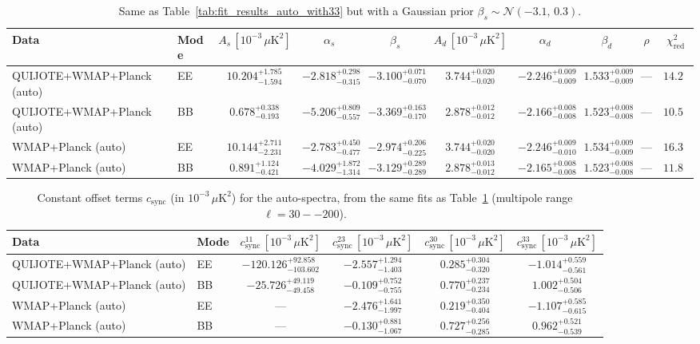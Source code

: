 \begin{table}[h]
\centering
\scriptsize
\setlength{\tabcolsep}{4pt}
\caption{Same as Table~\ref{tab:fit_results_auto_with33} but with a Gaussian prior $\beta_s \sim \mathcal{N}(-3.1,\,0.3)$.}
\label{tab:fit_results_auto_with33_prior_betas}
\begin{tabular}{llcccccccc}
\toprule
Data & Mode & $A_s\,[10^{-3}\,\mu\mathrm{K}^2]$ & $\alpha_s$ & $\beta_s$ & $A_d\,[10^{-3}\,\mu\mathrm{K}^2]$ & $\alpha_d$ & $\beta_d$ & $\rho$ & $\chi^2_\mathrm{red}$ \\
\midrule
QUIJOTE+WMAP+Planck (auto) & EE & $10.204^{+1.785}_{-1.594}$ & $-2.818^{+0.298}_{-0.315}$ & $-3.100^{+0.071}_{-0.070}$ & $3.744^{+0.020}_{-0.020}$ & $-2.246^{+0.009}_{-0.009}$ & $1.533^{+0.009}_{-0.009}$ & --- & $14.29$ \\
QUIJOTE+WMAP+Planck (auto) & BB & $0.678^{+0.338}_{-0.193}$ & $-5.206^{+0.809}_{-0.557}$ & $-3.369^{+0.163}_{-0.170}$ & $2.878^{+0.012}_{-0.012}$ & $-2.166^{+0.008}_{-0.008}$ & $1.523^{+0.008}_{-0.008}$ & --- & $10.53$ \\
WMAP+Planck (auto) & EE & $10.144^{+2.711}_{-2.231}$ & $-2.783^{+0.450}_{-0.477}$ & $-2.974^{+0.206}_{-0.225}$ & $3.744^{+0.020}_{-0.020}$ & $-2.246^{+0.009}_{-0.010}$ & $1.534^{+0.009}_{-0.009}$ & --- & $16.39$ \\
WMAP+Planck (auto) & BB & $0.891^{+1.124}_{-0.421}$ & $-4.029^{+1.872}_{-1.314}$ & $-3.129^{+0.289}_{-0.289}$ & $2.878^{+0.013}_{-0.012}$ & $-2.165^{+0.008}_{-0.008}$ & $1.523^{+0.008}_{-0.008}$ & --- & $11.88$ \\
\bottomrule
\end{tabular}
\end{table}

\begin{table}[h]
\centering
\scriptsize
\setlength{\tabcolsep}{4pt}
\caption{Constant offset terms $c_{\mathrm{sync}}$ (in $10^{-3}\,\mu\mathrm{K}^2$) for the auto-spectra, from the same fits as Table~\ref{tab:fit_results_auto_with33_prior_betas} (multipole range $\ell=30--200$).}
\label{tab:fit_results_auto_with33_prior_betas_c_terms}
\begin{tabular}{llcccc}
\toprule
Data & Mode & $c_{\mathrm{sync}}^{11}\,[10^{-3}\,\mu\mathrm{K}^2]$ & $c_{\mathrm{sync}}^{23}\,[10^{-3}\,\mu\mathrm{K}^2]$ & $c_{\mathrm{sync}}^{30}\,[10^{-3}\,\mu\mathrm{K}^2]$ & $c_{\mathrm{sync}}^{33}\,[10^{-3}\,\mu\mathrm{K}^2]$ \\
\midrule
QUIJOTE+WMAP+Planck (auto) & EE & $-120.126^{+92.858}_{-103.602}$ & $-2.557^{+1.294}_{-1.403}$ & $0.285^{+0.304}_{-0.320}$ & $-1.014^{+0.559}_{-0.561}$ \\
QUIJOTE+WMAP+Planck (auto) & BB & $-25.726^{+49.119}_{-49.458}$ & $-0.109^{+0.752}_{-0.755}$ & $0.770^{+0.237}_{-0.234}$ & $1.002^{+0.504}_{-0.506}$ \\
WMAP+Planck (auto) & EE & --- & $-2.476^{+1.641}_{-1.997}$ & $0.219^{+0.350}_{-0.404}$ & $-1.107^{+0.585}_{-0.615}$ \\
WMAP+Planck (auto) & BB & --- & $-0.130^{+0.881}_{-1.067}$ & $0.727^{+0.256}_{-0.285}$ & $0.962^{+0.521}_{-0.539}$ \\
\bottomrule
\end{tabular}
\end{table}
